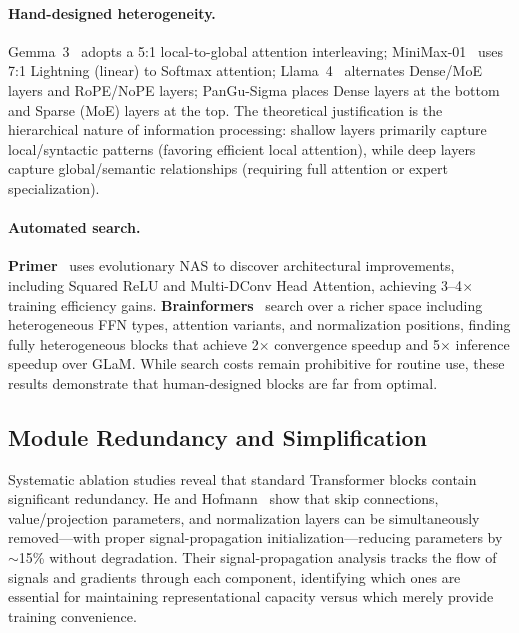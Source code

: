 \paragraph{Hand-designed heterogeneity.}
Gemma~3~\cite{gemma2025gemma3} adopts a 5:1 local-to-global attention interleaving; MiniMax-01~\cite{minimax2025} uses 7:1 Lightning (linear) to Softmax attention; Llama~4~\cite{llama4_2025} alternates Dense/MoE layers and RoPE/NoPE layers; PanGu-Sigma places Dense layers at the bottom and Sparse (MoE) layers at the top. The theoretical justification is the hierarchical nature of information processing: shallow layers primarily capture local/syntactic patterns (favoring efficient local attention), while deep layers capture global/semantic relationships (requiring full attention or expert specialization).

\paragraph{Automated search.}
\textbf{Primer}~\cite{so2021primer} uses evolutionary NAS to discover architectural improvements, including Squared ReLU and Multi-DConv Head Attention, achieving 3--4$\times$ training efficiency gains. \textbf{Brainformers}~\cite{zhou2023brainformers} search over a richer space including heterogeneous FFN types, attention variants, and normalization positions, finding fully heterogeneous blocks that achieve 2$\times$ convergence speedup and 5$\times$ inference speedup over GLaM. While search costs remain prohibitive for routine use, these results demonstrate that human-designed blocks are far from optimal.

\subsection{Module Redundancy and Simplification}
\label{subsec:module_redundancy}

Systematic ablation studies reveal that standard Transformer blocks contain significant redundancy. He and Hofmann~\cite{he2023simplifying} show that skip connections, value/projection parameters, and normalization layers can be simultaneously removed---with proper signal-propagation initialization---reducing parameters by $\sim$15\% without degradation. Their signal-propagation analysis tracks the flow of signals and gradients through each component, identifying which ones are essential for maintaining representational capacity versus which merely provide training convenience.

